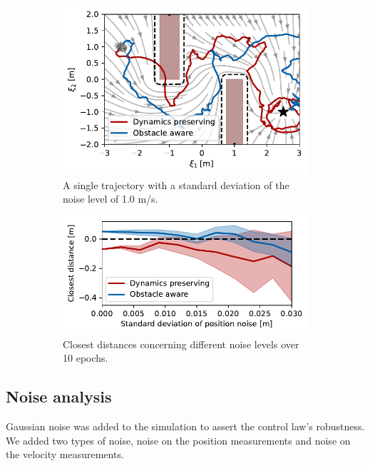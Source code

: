 \begin{figure}
    \centering
    \begin{subfigure}{\columnwidth}
      \centerline{\includegraphics[width=\textwidth]{figures/trajectory_position_noise}}
      \caption{A single trajectory with a standard deviation of the noise level of 1.0 m/s.}
      \label{fig:trajectory_position_noise}
    \end{subfigure}
    \begin{subfigure}{\columnwidth}
    \includegraphics[width=\textwidth]{figures/comparison_position_noise}
      \caption{Closest distances concerning different noise levels over 10 epochs.}
      \label{fig:comparison_position_noise}
    \end{subfigure}
    \caption{}
\label{fig:position_noise}
\end{figure}



\subsection{Noise analysis}
Gaussian noise was added to the simulation to assert the control law's robustness. We added two types of noise, noise on the position measurements and noise on the velocity measurements. 


